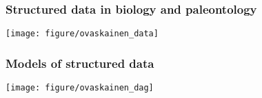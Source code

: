 \documentclass{beamer}
\begin{document}
\begin{frame}
  \frametitle{Structured data in biology and paleontology}

  \begin{center}
    \texttt{[image: figure/ovaskainen\_data]}
  \end{center}

  \tiny{}
\end{frame}

\begin{frame}
  \frametitle{Models of structured data}

  \begin{center}
    \texttt{[image: figure/ovaskainen\_dag]}
  \end{center}

  \tiny{}
\end{frame}

%
\end{document}
